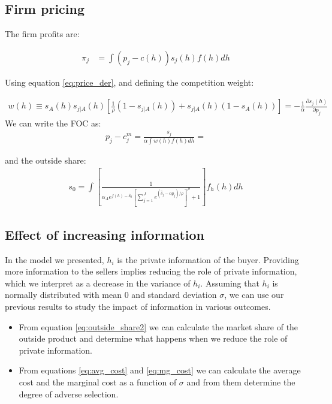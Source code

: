 \documentclass[12pt]{article}
\theoremstyle{plain}
\theoremstyle{plain}
\begin{document}
\subsection{Firm pricing}\label{sec:pricing}
The firm profits are:

\begin{align}
    \pi_j &= \int ( p_j -c(h) )s_j(h) f(h) dh  
\end{align}

Using equation \ref{eq:price_der}, and defining the competition weight: 

\begin{align}\label{eq:comp_weight}
    w(h) \equiv s_A(h)s_{j|A}(h)\left[\frac{1}{\rho}(1-s_{j|A}(h)) + s_{j|A}(h)(1-s_A(h))\right]   = -\frac{1}{\alpha} \frac{\partial s_j(h)}{\partial p_j} 
\end{align}
We can write the FOC as: 
\begin{align}
    p_j- c^m_j  = \frac{ s_j}{\alpha \int w(h) f(h) dh} = 
\end{align}

and the outside share: 
\begin{align}\label{eq:outside_share2}
    s_0 = \int \left[ \frac{1}{\alpha_A e^{f(h) -\delta_0}\left[\sum_{j=1}^{J}e^{(\hat{\delta}_j  - \alpha p_j)/\rho}\right]^\rho + 1 } \right] f_h(h) dh
\end{align}


\subsection{Effect of increasing information}

In the model we presented, $h_i$ is the private information of the buyer. Providing more information to the sellers implies reducing the role of private information, which we interpret as a decrease in the variance of $h_i$. Assuming that $h_i$ is normally distributed with mean $0$ and standard deviation $\sigma$, we can use our previous results to study the impact of information in various outcomes.

\begin{itemize}
    \item From equation \ref{eq:outside_share2} we can calculate the market share of the outside product and determine what happens when we reduce the role of private information. 

    \item From equations \ref{eq:avg_cost} and \ref{eq:mg_cost} we can calculate the average cost and the marginal cost as a function of $\sigma$ and from them determine the degree of adverse selection. 

\end{itemize}
\end{document}
